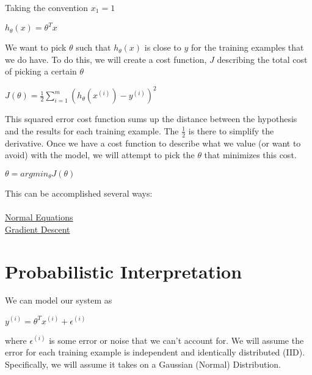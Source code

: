 \documentclass{article}
\begin{document}
\begin{flushright}Taking the convention $x_1 = 1$\\
\end{flushright}

\begin{center}
$h_{\theta}(x) = \theta^Tx$ \\
\end{center}

We want to pick $\theta$ such that $h_\theta(x)$ is close to $y$ for the training examples that we do have. To do this, we will create a cost function, $J$ describing the total cost of picking a certain $\theta$\\

\begin{center}
$J(\theta) = \frac{1}{2} \sum_{i=1}^m {(h_\theta(x^{(i)}) - y^{(i)})}^2$ \\
\end{center}

This squared error cost function sums up the distance between the hypothesis and the results for each training example. The $\frac{1}{2}$ is there to simplify the derivative. Once we have a cost function to describe what we value (or want to avoid) with the model, we will attempt to pick the $\theta$ that minimizes this cost.\\

\begin{center}
$\theta = argmin_\theta J(\theta)$\\
\end{center}


This can be accomplished several ways:\\
\\
\href{normal-equations.pdf}{Normal Equations}\\
\href{gradient-descent.pdf}{Gradient Descent}\\

\section{Probabilistic Interpretation}
We can model our system as
\begin{center}
$y^{(i)} = \theta^Tx^{(i)} + \epsilon^{(i)}$
\end{center}
where $\epsilon^{(i)}$ is some error or noise that we can't account for. We will assume the error for each training example is independent and identically distributed (IID). Specifically, we will assume it takes on a Gaussian (Normal) Distribution.
\end{document}
